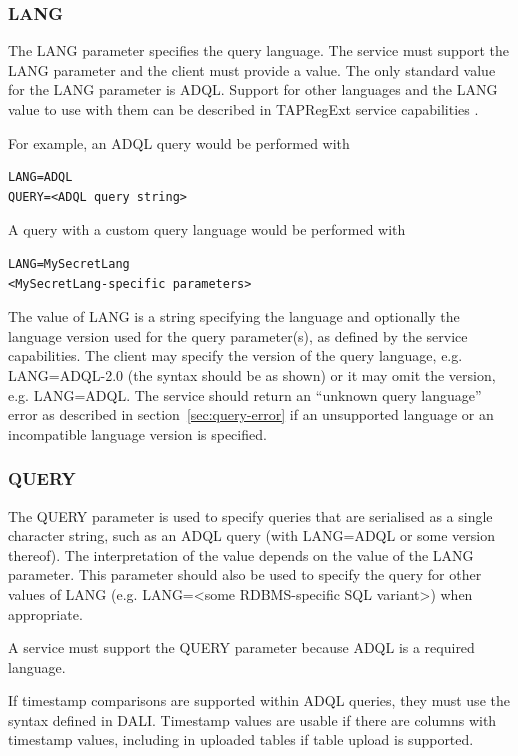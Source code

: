 \documentclass[11pt,letter]{ivoa}
\begin{document}
\subsubsection{LANG}
\label{sec:LANG}

The LANG parameter specifies the query language. The service must support the LANG 
parameter and the client must provide a value. The only standard 
value for the LANG parameter is ADQL. Support for other 
languages and the LANG value to use with them can be described in
TAPRegExt service 
capabilities \citep{2012ivoa.spec.0827D}.

For example, an ADQL query would be performed with
\begin{verbatim}
LANG=ADQL
QUERY=<ADQL query string>
\end{verbatim}
A query with a custom query language would be performed with
\begin{verbatim}
LANG=MySecretLang
<MySecretLang-specific parameters>
\end{verbatim}
The value of LANG is a string specifying the language and optionally the 
language version used for the query parameter(s), as defined by the service 
capabilities.  The client may specify the version of the query language,  e.g. 
LANG=ADQL-2.0 (the syntax should be as shown) or it may omit the version, e.g. 
LANG=ADQL.  The service should return an “unknown query language” error as 
described in section~\ref{sec:query-error} if an unsupported language or an incompatible 
language version is specified.

\subsubsection{QUERY}
\label{sec:QUERY}

The QUERY parameter is used to specify queries that are serialised as a single character string, such as an ADQL query (with LANG=ADQL or some version thereof). The  interpretation
of the value depends on the value of the LANG parameter. This parameter should also be used to 
specify the query for other values of LANG (e.g. LANG=<some RDBMS-specific SQL 
variant>) when appropriate.

A service must support the QUERY parameter because ADQL is a required language.

If timestamp comparisons are supported within ADQL queries, they must use the syntax 
defined in DALI. Timestamp values are usable if there are columns with timestamp values, 
including in uploaded tables if table upload is supported.
\end{document}
